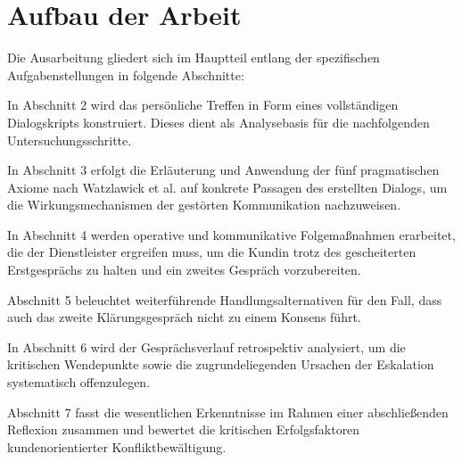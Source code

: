 \section{Aufbau der Arbeit}
Die Ausarbeitung gliedert sich im Hauptteil entlang der spezifischen Aufgabenstellungen in folgende Abschnitte:

In Abschnitt 2 wird das persönliche Treffen in Form eines vollständigen Dialogskripts konstruiert. Dieses dient als Analysebasis für die nachfolgenden Untersuchungsschritte.

In Abschnitt 3 erfolgt die Erläuterung und Anwendung der fünf pragmatischen Axiome nach Watzlawick et al. auf konkrete Passagen des erstellten Dialogs, um die Wirkungsmechanismen der gestörten Kommunikation nachzuweisen.

In Abschnitt 4 werden operative und kommunikative Folgemaßnahmen erarbeitet, die der Dienstleister ergreifen muss, um die Kundin trotz des gescheiterten Erstgesprächs zu halten und ein zweites Gespräch vorzubereiten.

Abschnitt 5 beleuchtet weiterführende Handlungsalternativen für den Fall, dass auch das zweite Klärungsgespräch nicht zu einem Konsens führt.

In Abschnitt 6 wird der Gesprächsverlauf retrospektiv analysiert, um die kritischen Wendepunkte sowie die zugrundeliegenden Ursachen der Eskalation systematisch offenzulegen.

Abschnitt 7 fasst die wesentlichen Erkenntnisse im Rahmen einer abschließenden Reflexion zusammen und bewertet die kritischen Erfolgsfaktoren kundenorientierter Konfliktbewältigung.

